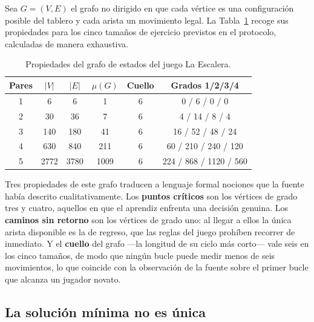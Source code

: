 \documentclass{book}
\begin{document}
Sea $G=(V,E)$ el grafo no dirigido en que cada vértice es una
configuración posible del tablero y cada arista un movimiento
legal. La Tabla~\ref{tab:propiedades_grafo} recoge sus propiedades
para los cinco tamaños de ejercicio previstos en el protocolo,
calculadas de manera exhaustiva.

\begin{table}[H]
\centering
\caption{Propiedades del grafo de estados del juego La Escalera.}
\label{tab:propiedades_grafo}
\renewcommand{\arraystretch}{1.25}
\begin{tabular}{|c|c|c|c|c|c|}
\hline
\textbf{Pares} & \textbf{$|V|$} & \textbf{$|E|$} & \textbf{$\mu(G)$} & \textbf{Cuello} & \textbf{Grados 1/2/3/4} \\
\hline
1 & 6    & 6    & 1    & 6 & 0 / 6 / 0 / 0 \\
2 & 30   & 36   & 7    & 6 & 4 / 14 / 8 / 4 \\
3 & 140  & 180  & 41   & 6 & 16 / 52 / 48 / 24 \\
4 & 630  & 840  & 211  & 6 & 60 / 210 / 240 / 120 \\
5 & 2772 & 3780 & 1009 & 6 & 224 / 868 / 1120 / 560 \\
\hline
\end{tabular}
\end{table}

Tres propiedades de este grafo traducen a lenguaje formal nociones
que la fuente había descrito cualitativamente. Los
\textbf{puntos críticos} son los vértices de grado tres y cuatro,
aquellos en que el aprendiz enfrenta una decisión genuina. Los
\textbf{caminos sin retorno} son los vértices de grado uno: al
llegar a ellos la única arista disponible es la de regreso, que las
reglas del juego prohíben recorrer de inmediato. Y el
\textbf{cuello} del grafo —la longitud de su ciclo más corto— vale
seis en los cinco tamaños, de modo que ningún bucle puede medir
menos de seis movimientos, lo que coincide con la observación de la
fuente sobre el primer bucle que alcanza un jugador novato.


\subsection*{La solución mínima no es única}
\end{document}
